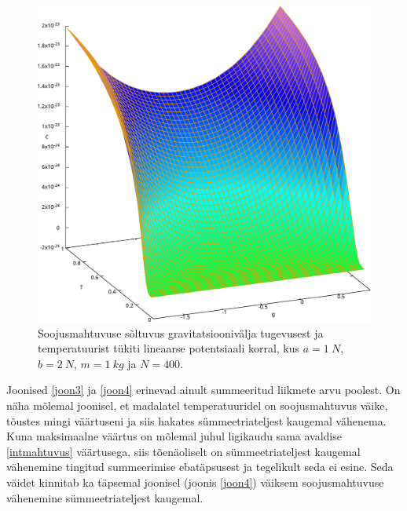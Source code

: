 \documentclass{trkut}%
\begin{document}
\begin{figure}[htb!]
    \includegraphics[width=\textwidth]{maxima/m1a1b2T0_1S400.pdf}
    \caption{Soojusmahtuvuse sõltuvus gravitatsioonivälja tugevusest ja temperatuurist tükiti lineaarse potentsiaali korral, kus $a=\SI{1}{N}$, $b=\SI{2}{N}$, $m=\SI{1}{kg}$ ja $N=400$.}
    \label{joon5}
\end{figure}

Joonised \ref{joon3} ja \ref{joon4} erinevad ainult summeeritud liikmete arvu poolest.
On näha mõlemal joonisel, et madalatel temperatuuridel on soojusmahtuvus väike, tõustes mingi väärtuseni ja siis hakates sümmeetriateljest kaugemal vähenema.
Kuna maksimaalne väärtus on mõlemal juhul ligikaudu sama avaldise \eqref{intmahtuvus} väärtusega, siis tõenäoliselt on sümmeetriateljest kaugemal vähenemine tingitud summeerimise ebatäpsusest ja tegelikult seda ei esine.
Seda väidet kinnitab ka täpsemal joonisel (joonis \ref{joon4}) väiksem soojusmahtuvuse vähenemine sümmeetriateljest kaugemal.
\end{document}
